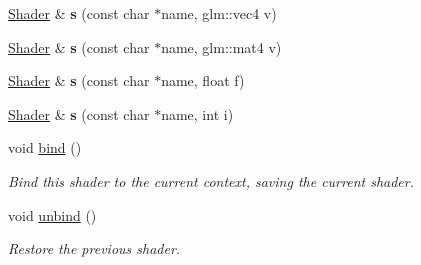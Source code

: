 \begin{DoxyCompactItemize}
\item 
\hypertarget{classs9_1_1gl_1_1Shader_af51d74294db62051f4ca5ee7882fe6ae}{\hyperlink{classs9_1_1gl_1_1Shader}{Shader} \& {\bfseries s} (const char $\ast$name, glm\-::vec4 v)}\label{classs9_1_1gl_1_1Shader_af51d74294db62051f4ca5ee7882fe6ae}

\item 
\hypertarget{classs9_1_1gl_1_1Shader_a6e690397a8d663132b15e863b2a39821}{\hyperlink{classs9_1_1gl_1_1Shader}{Shader} \& {\bfseries s} (const char $\ast$name, glm\-::mat4 v)}\label{classs9_1_1gl_1_1Shader_a6e690397a8d663132b15e863b2a39821}

\item 
\hypertarget{classs9_1_1gl_1_1Shader_a2728b38fb018d9238697fbf5b3300b8b}{\hyperlink{classs9_1_1gl_1_1Shader}{Shader} \& {\bfseries s} (const char $\ast$name, float f)}\label{classs9_1_1gl_1_1Shader_a2728b38fb018d9238697fbf5b3300b8b}

\item 
\hypertarget{classs9_1_1gl_1_1Shader_a997847a1445032738c7ec6f3c4e6b78b}{\hyperlink{classs9_1_1gl_1_1Shader}{Shader} \& {\bfseries s} (const char $\ast$name, int i)}\label{classs9_1_1gl_1_1Shader_a997847a1445032738c7ec6f3c4e6b78b}

\item 
\hypertarget{classs9_1_1gl_1_1Shader_aa093f3ad27b49cc62950faa98343b974}{void \hyperlink{classs9_1_1gl_1_1Shader_aa093f3ad27b49cc62950faa98343b974}{bind} ()}\label{classs9_1_1gl_1_1Shader_aa093f3ad27b49cc62950faa98343b974}

\begin{DoxyCompactList}\small\item\em Bind this shader to the current context, saving the current shader. \end{DoxyCompactList}\item 
\hypertarget{classs9_1_1gl_1_1Shader_a10c6c9ee752aab4e531536917cc558fe}{void \hyperlink{classs9_1_1gl_1_1Shader_a10c6c9ee752aab4e531536917cc558fe}{unbind} ()}\label{classs9_1_1gl_1_1Shader_a10c6c9ee752aab4e531536917cc558fe}

\begin{DoxyCompactList}\small\item\em Restore the previous shader. \end{DoxyCompactList}\end{DoxyCompactItemize}
